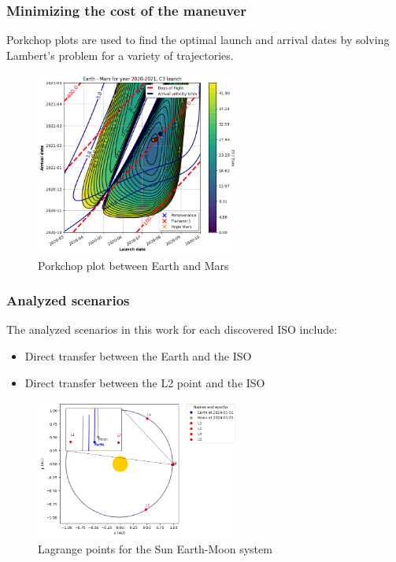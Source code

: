 \documentclass[xcolor={dvipsnames}]{beamer}
\begin{document}
\begin{frame}
\frametitle{Minimizing the cost of the maneuver}

Porkchop plots are used to find the optimal launch and arrival dates by solving
Lambert's problem for a variety of trajectories.

\pause

\begin{figure}[h]
    \centering
    \includegraphics[width=0.6\textwidth]{fig/static/porkchop.png}
    \caption{Porkchop plot between Earth and Mars}
    \label{fig:porkchop}
\end{figure}

\end{frame}

\begin{frame}
\frametitle{Analyzed scenarios}

The analyzed scenarios in this work for each discovered ISO include:

\vspace{0.25cm}
\begin{itemize}
    \item Direct transfer between the Earth and the ISO
    \item Direct transfer between the L2 point and the ISO
\end{itemize}

\pause

\begin{figure}[h]
    \centering
    \includegraphics[width=0.6\textwidth]{fig/static/lagrange_points.png}
    \caption{Lagrange points for the Sun Earth-Moon system}
    \label{fig:lagrange}
\end{figure}

\end{frame}
\end{document}
